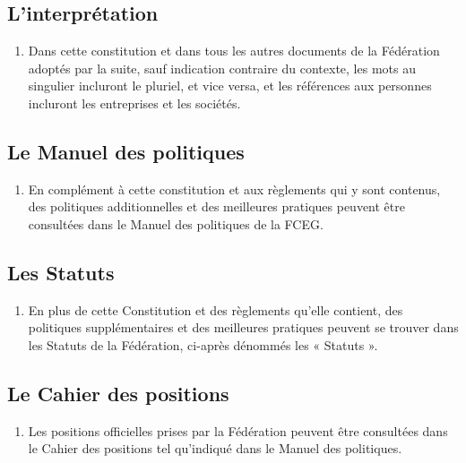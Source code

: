 \subsection{L'interprétation}
\label{l-interpretation}

\begin{enumerate}
 \item
  Dans cette constitution et dans tous les autres documents de la Fédération adoptés par la suite, sauf indication contraire du contexte, les mots au singulier incluront le pluriel, et vice versa, et les références aux personnes incluront les entreprises et les sociétés.
\end{enumerate}

\subsection{Le Manuel des politiques}
\label{le-manuel-des-politiques}

\begin{enumerate}
 \item
  En complément à cette constitution et aux règlements qui y sont contenus, des politiques additionnelles et des meilleures pratiques peuvent être consultées dans le Manuel des politiques de la FCEG.
\end{enumerate}

\subsection{Les Statuts}
\label{les-statuts}

\begin{enumerate}
 \item
  En plus de cette Constitution et des règlements qu'elle contient, des politiques supplémentaires et des meilleures pratiques peuvent se trouver dans les Statuts de la Fédération, ci-après dénommés les « Statuts ».
\end{enumerate}

\subsection{Le Cahier des positions}
\label{le-cahier-des-positions}

\begin{enumerate}
 \item
  Les positions officielles prises par la Fédération peuvent être consultées dans le Cahier des positions tel qu'indiqué dans le Manuel des politiques.
\end{enumerate}
